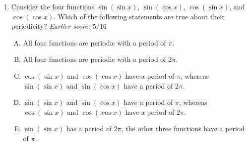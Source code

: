 \documentclass[10pt]{amsart}
\begin{document}
\begin{enumerate}
  \begin{enumerate}[(A)]
  \item If $F'(x) = G'(x)$ for all integers $x$, then $F - G$ is a
    constant function when restricted to integers, i.e., it takes the
    same value at all integers.
  \item If $F'(x) = G'(x)$ for all numbers $x$ that are not integers,
    then $F - G$ is a constant function when restricted to the set of
    numbers $x$ that are not integers.
  \item If $F'(x) = G'(x)$ for all rational numbers $x$, then $F - G$
    is a constant function when restricted to the set of rational
    numbers.
  \item If $F'(x) = G'(x)$ for all irrational numbers $x$, then $F -
    G$ is a constant function when restricted to the set of irrational
    numbers.
  \item None of the above, i.e., they are all necessarily true.
  \end{enumerate}

  {\em Answer}: Option (A).

  {\em Explanation}: The fact that the derivatives of two functions
  agree at integers says nothing about how the derivatives behave
  elsewhere -- they could differ quite a bit at other places. Hence,
  (A) is not necessarily true, and hence must be the right option. All
  the other options are correct as statements and hence cannot be the
  right option. This is because in all of them, the set of points
  where the derivatives agree is {\em dense} -- it intersects every
  open interval. So, continuity forces the functions $F'$ and $G'$ to
  be equal everywhere, forcing $F - G$ to be constant everywhere.

  {\em Performance review}: $8$ out of $11$ got this. $2$ chose (E),
  $1$ chose (D).

  {\em Historical note (last year)}: $11$ out of $28$ people got this
  correct. $8$ people chose (E), $5$ people chose (C), and $2$ people
  each chose (B) and (D).
\item Consider the four functions $\sin(\sin x)$, $\sin(\cos x)$,
  $\cos(\sin x)$, and $\cos(\cos x)$. Which of the following
  statements are true about their periodicity? {\em Earlier score:
  $5/16$}

  \begin{enumerate}[(A)]
  \item All four functions are periodic with a period of $\pi$.
  \item All four functions are periodic with a period of $2\pi$.
  \item $\cos(\sin x)$ and $\cos(\cos x)$ have a period of $\pi$,
    whereas $\sin(\sin x)$ and $\sin(\cos x)$ have a period of $2\pi$.
  \item $\sin(\sin x)$ and $\sin(\cos x)$ have a period of $\pi$,
    whereas $\cos(\sin x)$ and $\cos(\cos x)$ have a period of $2\pi$.
  \item $\sin(\sin x)$ has a period of $2\pi$, the other three
    functions have a period of $\pi$.
  \end{enumerate}
  

\end{enumerate}
\end{document}
